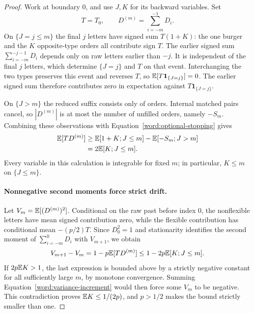 \begin{proof}
Work at boundary $0$, and use $J,K$ for its backward variables. Set
\[
 T=T_0,\qquad D^{(m)}=\sum_{i=-m}^{-1}D_i.
\]
On $\{J=j\le m\}$ the final $j$ letters have signed sum $T(1+K)$:
the one burger and the $K$ opposite-type orders all contribute sign
$T$. The earlier signed sum $\sum_{i=-m}^{-j-1}D_i$ depends only on
raw letters earlier than $-j$. It is independent of the final $j$
letters, which determine $\{J=j\}$ and $T$ on that event.
Interchanging the two types preserves this event and reverses $T$,
so $\mathbb E[T\mathbf1_{\{J=j\}}]=0$. The earlier signed sum therefore
contributes zero in expectation against $T\mathbf1_{\{J=j\}}$.

On $\{J>m\}$ the reduced suffix consists only of orders. Internal
matched pairs cancel, so $|D^{(m)}|$ is at most the number of unfilled
orders, namely $-S_m$. Combining these observations with
Equation~\eqref{word:optional-stopping} gives
\begin{align}
 \mathbb E[T D^{(m)}]
 &\ge \mathbb E[1+K;J\le m]-\mathbb E[-S_m;J>m]\notag\\
 &=2\mathbb E[K;J\le m].\label{word:covariance}
\end{align}
Every variable in this calculation is integrable for fixed $m$; in
particular, $K\le m$ on $\{J\le m\}$.

\paragraph{Nonnegative second moments force strict drift.}
Let $V_m=\mathbb E[(D^{(m)})^2]$. Conditional on the raw past before index $0$,
the nonflexible letters have mean signed contribution zero, while the
flexible contribution has conditional mean $-(p/2)T$. Since $D_0^2=1$
and stationarity identifies the second moment of
$\sum_{i=-m}^{0}D_i$ with $V_{m+1}$, we obtain
\begin{equation}\label{word:variance-increment}
 V_{m+1}-V_m
   =1-p\mathbb E[T D^{(m)}]
   \le 1-2p\mathbb E[K;J\le m].
\end{equation}
If $2p\mathbb E K>1$, the last expression is bounded above by a strictly
negative constant for all sufficiently large $m$, by monotone
convergence. Summing Equation~\eqref{word:variance-increment} would then
force some $V_m$ to be negative. This contradiction proves
$\mathbb E K\le1/(2p)$, and $p>1/2$ makes the bound strictly smaller than one.
\end{proof}
